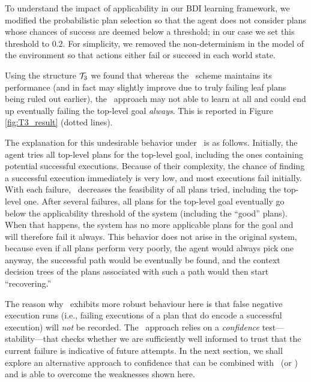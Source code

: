 To understand the impact of applicability in our BDI learning framework, we
modified the probabilistic plan selection so that the agent does not consider
plans whose chances of success are deemed below a threshold; in our case we set
this threshold to $0.2$.
For simplicity, we  removed the non-determinism in the model of the
environment so that actions either fail or succeed in each world state.

Using the structure ${\mathcal{T}}_3$ we found that whereas the \BUL\ scheme maintains its
performance (and in fact may slightly improve due to truly failing leaf plans
being ruled out earlier), the \CL\ approach may not able to learn at all and
could end up eventually failing the top-level goal \emph{always}. This is
reported in Figure \ref{fig:T3_result} (dotted lines).

The explanation for this undesirable behavior under \CL\ is as follows.
Initially, the agent tries all top-level plans for the top-level goal, including
the ones containing potential successful executions. Because of their complexity,
the chance of finding a successful execution immediately is very low, and most
executions fail initially. With each failure, \CL\ decreases the feasibility of
all plans tried, including the top-level one.  After several failures, all plans
for the top-level goal eventually go below the applicability threshold of the
system (including the ``good'' plans). When that happens, the system has no more
applicable plans for the goal and will therefore fail it always.
This behavior does not arise in the original system, because even if all plans
perform very poorly, the agent would always pick one anyway, the successful path
would be eventually be found, and the context decision trees of the plans
associated with such a path would then start ``recovering.''


The reason why \BUL\ exhibits more robust behaviour here is that false negative
execution runs (i.e., failing executions of a plan that do encode a successful
execution) will \emph{not} be recorded.
The \BUL\ approach relies on a \emph{confidence} test---stability---that checks
whether we are sufficiently well informed to trust that the current failure is
indicative of future attempts.
In the next section, we shall explore an alternative approach to confidence that
can be combined with \CL\ (or \BUL) and is able to overcome the weaknesses shown
here.




